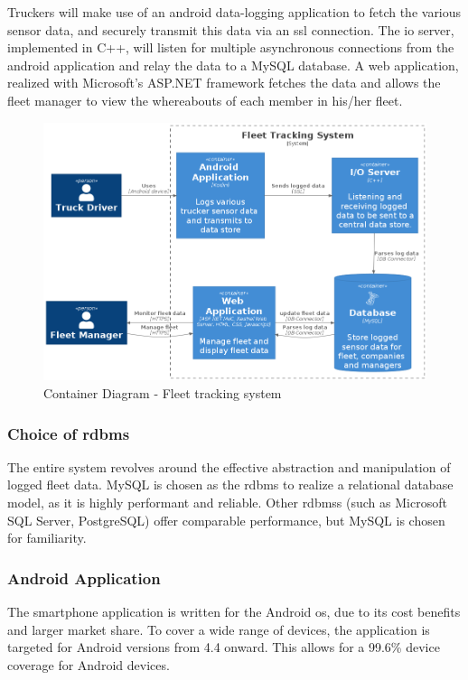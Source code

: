 Truckers will make use of an android data-logging application to fetch the various sensor data, and securely transmit this data via an \ac{ssl} connection.
The \ac{io} server, implemented in C++, will listen for multiple asynchronous connections from the android application and relay the data to a MySQL database.
A web application, realized with Microsoft's ASP.NET framework fetches the data and allows the fleet manager to view the whereabouts of each member in his/her fleet.
\begin{figure}[H]
\centering
\includegraphics[width=6in]{../diag/container.png}
\caption{Container Diagram - Fleet tracking system}
\label{fig:container}
\end{figure}

\subsubsection{Choice of \ac{rdbms}}
The entire system revolves around the effective abstraction and manipulation of logged fleet data.
MySQL is chosen as the \ac{rdbms} to realize a relational database model, as it is highly performant and reliable.
Other \ac{rdbms}s (such as Microsoft SQL Server, PostgreSQL) offer comparable performance, but MySQL is chosen for familiarity.

\subsubsection{Android Application}
The smartphone application is written for the Android \ac{os}, due to its cost benefits and larger market share.
To cover a wide range of devices, the application is targeted for Android versions from 4.4 onward.
This allows for a 99.6\% device coverage for Android devices.

